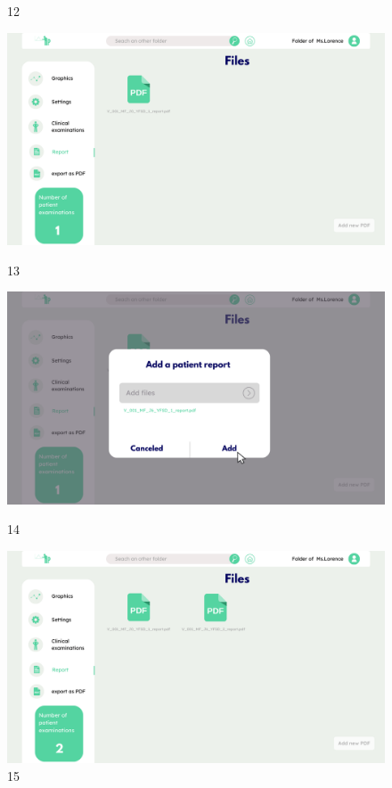 \begin{figure}[H]
\begin{minipage}{0.3\textwidth}
        \caption*{12}
    \end{minipage}
    \begin{minipage}{0.3\textwidth}
        \centering
        \includegraphics[width=\textwidth]{images/Prototype/13.png}
        \caption*{13}
    \end{minipage}
    \begin{minipage}{0.3\textwidth}
        \centering
        \includegraphics[width=\textwidth]{images/Prototype/14.png}
        \caption*{14}
    \end{minipage}
    \begin{minipage}{0.3\textwidth}
        \centering
        \includegraphics[width=\textwidth]{images/Prototype/15.png}
        \caption*{15}
    \end{minipage}
    \label{fig:plateforme_imaginee}
\end{figure}
